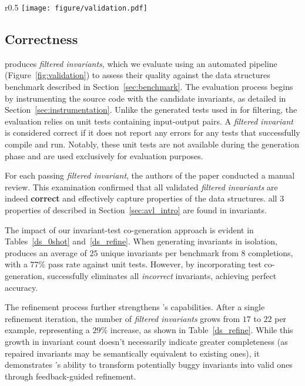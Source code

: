 \begin{wrapfigure}{r}{0.5\textwidth}  %
    \centering
    \texttt{[image: figure/validation.pdf]}  %
    \caption{Evaluation of \tech generated invariants}
    \label{fig:validation}
\end{wrapfigure}

\subsection{Correctness}
\label{subsec:correctness}

\tech produces \textit{filtered invariants}, which we evaluate using an automated pipeline (Figure~\ref{fig:validation}) to assess their quality against the data structures benchmark described in Section~\ref{sec:benchmark}. The evaluation process begins by instrumenting the source code with the candidate invariants, as detailed in Section~\ref{sec:instrumentation}. 
Unlike the generated tests used in \tech for filtering, the evaluation relies on unit tests containing input-output pairs. A \textit{filtered invariant} is considered correct if it does not report any errors for any tests that successfully compile and run. Notably, these unit tests are not available during the \tech generation phase and are used exclusively for evaluation purposes.

For each passing \textit{filtered invariant}, the authors of the paper conducted a manual review. This examination confirmed that all validated \textit{filtered invariants} are indeed \textbf{correct} and effectively capture properties of the data structures. \eg all 3 properties of  described in Section~\ref{sec:avl_intro} are found in \tech invariants.

The impact of our invariant-test co-generation approach is evident in Tables~\ref{ds_0shot} and~\ref{ds_refine}. When generating invariants in isolation, \tech produces an average of $25$ unique invariants per benchmark from $8$ completions, with a $77\%$ pass rate against unit tests. However, by incorporating test co-generation, \tech successfully eliminates all \emph{incorrect} invariants, achieving perfect accuracy.

The refinement process further strengthens \tech's capabilities. After a single refinement iteration, the number of \textit{filtered invariants} grows from $17$ to $22$ per example, representing a $29\%$ increase, as shown in Table~\ref{ds_refine}. While this growth in invariant count doesn't necessarily indicate greater completeness (as repaired invariants may be semantically equivalent to existing ones), it demonstrates \tech's ability to transform potentially buggy invariants into valid ones through feedback-guided refinement.

